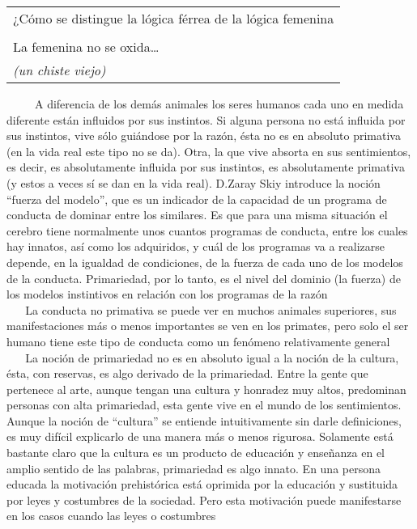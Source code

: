 \begin{longtable}[]{@{}l@{}}
\toprule
¿Cómo se distingue la lógica férrea de la lógica femenina\tabularnewline
\tabularnewline
La femenina no se oxida\ldots{}\tabularnewline
\emph{(un chiste viejo)}\tabularnewline
\bottomrule
\end{longtable}

~ ~ ~ A diferencia de los demás animales los seres humanos cada uno en
medida diferente están influidos por sus instintos. Si alguna persona no
está influida por sus instintos, vive sólo guiándose por la razón, ésta
no es en absoluto primativa (en la vida real este tipo no se da). Otra,
la que vive absorta en sus sentimientos, es decir, es absolutamente
influida por sus instintos, es absolutamente primativa (y estos a veces
sí se dan en la vida real). D.Zaray Skiy introduce la noción ``fuerza
del modelo'', que es un indicador de la capacidad de un programa de
conducta de dominar entre los similares. Es que para una misma situación
el cerebro tiene normalmente unos cuantos programas de conducta, entre
los cuales hay innatos, así como los adquiridos, y cuál de los programas
va a realizarse depende, en la igualdad de condiciones, de la fuerza de
cada uno de los modelos de la conducta. Primariedad, por lo tanto, es el
nivel del dominio (la fuerza) de los modelos instintivos en relación con
los programas de la razón\\
\hspace*{0.333em} ~ ~ La conducta no primativa se puede ver en muchos
animales superiores, sus manifestaciones más o menos importantes se ven
en los primates, pero solo el ser humano tiene este tipo de conducta
como un fenómeno relativamente general\\
\hspace*{0.333em} ~ ~ La noción de primariedad no es en absoluto igual a
la noción de la cultura, ésta, con reservas, es algo derivado de la
primariedad. Entre la gente que pertenece al arte, aunque tengan una
cultura y honradez muy altos, predominan personas con alta primariedad,
esta gente vive en el mundo de los sentimientos. Aunque la noción de
``cultura'' se entiende intuitivamente sin darle definiciones, es muy
difícil explicarlo de una manera más o menos rigurosa. Solamente está
bastante claro que la cultura es un producto de educación y enseñanza en
el amplio sentido de las palabras, primariedad es algo innato. En una
persona educada la motivación prehistórica está oprimida por la
educación y sustituida por leyes y costumbres de la sociedad. Pero esta
motivación puede manifestarse en los casos cuando las leyes o costumbres
